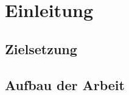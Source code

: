 \section{Einleitung}\label{sec:einleitung}

\subsection{Zielsetzung}\label{subsec:zielsetzung}

\subsection{Aufbau der Arbeit}\label{subsec:aufbau-der-arbeit}
